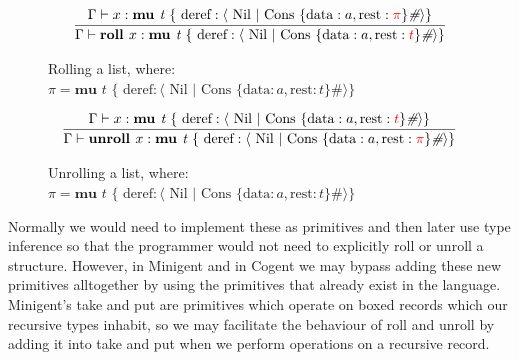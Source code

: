 \begin{figure}
    \centering
    \begin{align*}
        \infer{
            \Gamma \vdash \textbf{roll } x : \textbf{mu } \textit{t } \{ \text{ deref}: \langle \text{ Nil } \vert \text{ Cons } \{ \text{data}: a, \text{rest}: {\color{red} t} \}\textit{\#} \rangle \} 
        }{
            \Gamma \vdash x : \textbf{mu } \textit{t } \{ \text{ deref}: \langle \text{ Nil } \vert \text{ Cons } \{ \text{data}: a, \text{rest}: {\color{red} \pi} \}\textit{\#} \rangle \} 
        }
    \end{align*}
    \caption{Rolling a list, where: \newline \protect\phantom{Figure x.x:} $\pi = \textbf{mu } \textit{t } \{ \text{ deref}: \langle \text{ Nil } \vert \text{ Cons } \{ \text{data}: a, \text{rest}: t \}\textit{\#} \rangle \}$}
    \label{fig:rollexample}
\end{figure}

\begin{figure}
    \centering
    \begin{align*}
        \infer{
            \Gamma \vdash \textbf{unroll } x : \textbf{mu } \textit{t } \{ \text{ deref}: \langle \text{ Nil } \vert \text{ Cons } \{ \text{data}: a, \text{rest}: {\color{red} \pi}  \}\textit{\#} \rangle \} 
        }{
            \Gamma \vdash x : \textbf{mu } \textit{t } \{ \text{ deref}: \langle \text{ Nil } \vert \text{ Cons } \{ \text{data}: a, \text{rest}: {\color{red} t} \}\textit{\#} \rangle \} 
        }
    \end{align*}
    \caption{Unrolling a list, where: \newline \protect\phantom{Figure x.x:} $\pi = \textbf{mu } \textit{t } \{ \text{ deref}: \langle \text{ Nil } \vert \text{ Cons } \{ \text{data}: a, \text{rest}: t \}\textit{\#} \rangle \}$}
    \label{fig:unrollexample}
\end{figure}

Normally we would need to implement these as primitives and then later use type inference so that
the programmer would not need to explicitly roll or unroll a structure. However,
in Minigent and in Cogent we may bypass adding these new primitives alltogether by using the primitives
that already exist in the language. Minigent's \textsf{take} and \textsf{put} are primitives which
operate on boxed records which our recursive types inhabit, so we may facilitate the behaviour
of roll and unroll by adding it into take and put when we perform operations on a recursive record.

